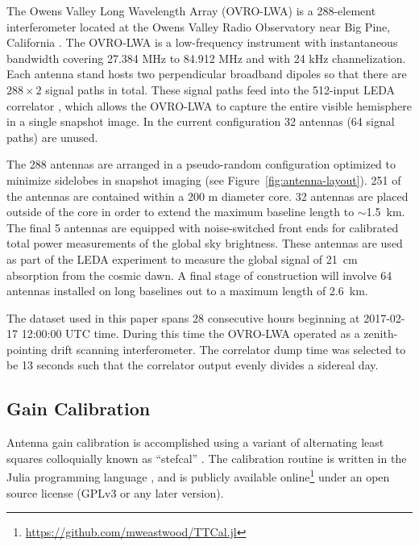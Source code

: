 \documentclass[twocolumn]{aastex61}
\begin{document}
The Owens Valley Long Wavelength Array (OVRO-LWA) is a 288-element interferometer located at the
Owens Valley Radio Observatory near Big Pine, California \citep{hallinan_2017}.  The OVRO-LWA
is a low-frequency instrument with instantaneous bandwidth covering 27.384 MHz to 84.912 MHz and
with 24 kHz channelization.  Each antenna stand hosts two perpendicular broadband dipoles so that
there are $288\times2$ signal paths in total. These signal paths feed into the 512-input LEDA
correlator \citep{2015JAI.....450003K}, which allows the OVRO-LWA to capture the entire visible
hemisphere in a single snapshot image.  In the current configuration 32 antennas (64 signal paths)
are unused.

The 288 antennas are arranged in a pseudo-random configuration optimized to minimize sidelobes in
snapshot imaging (see Figure~\ref{fig:antenna-layout}).  251 of the antennas are contained within a
200 m diameter core. 32 antennas are placed outside of the core in order to extend the maximum
baseline length to $\sim$1.5~km. The final 5 antennas are equipped with noise-switched front ends
for calibrated total power measurements of the global sky brightness.  These antennas are used as
part of the LEDA experiment \citep{price_2017} to measure the global signal of 21~cm absorption from
the cosmic dawn. A final stage of construction will involve 64 antennas installed on long baselines
out to a maximum length of 2.6~km.

The dataset used in this paper spans 28 consecutive hours beginning at 2017-02-17 12:00:00 UTC time.
During this time the OVRO-LWA operated as a zenith-pointing drift scanning interferometer.  The
correlator dump time was selected to be 13 seconds such that the correlator output evenly divides a
sidereal day.

\subsection{Gain Calibration}\label{sec:gaincal}

Antenna gain calibration is accomplished using a variant of alternating least squares colloquially
known as ``stefcal'' \citep{2008ISTSP...2..707M, 2014A&A...571A..97S}. The calibration routine is
written in the Julia programming language \citep{doi:10.1137/141000671}, and is publicly available
online\footnote{\url{https://github.com/mweastwood/TTCal.jl}} under an open source license (GPLv3 or
any later version).
\end{document}
